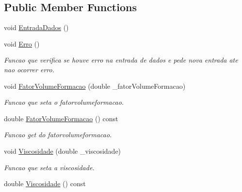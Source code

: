 \subsection*{Public Member Functions}
\begin{DoxyCompactItemize}
\item 
void \hyperlink{classCFluido_a763eff2c0992744c8482beb56171981d}{Entrada\-Dados} ()
\item 
\hypertarget{classCFluido_a6262833c7f9a37dd886a1b8c5cf798d5}{void \hyperlink{classCFluido_a6262833c7f9a37dd886a1b8c5cf798d5}{Erro} ()}\label{classCFluido_a6262833c7f9a37dd886a1b8c5cf798d5}

\begin{DoxyCompactList}\small\item\em Funcao que verifica se houve erro na entrada de dados e pede nova entrada ate nao ocorrer erro. \end{DoxyCompactList}\item 
\hypertarget{classCFluido_ad8d3ec53a4cb37b3824ec3d64a49c2bc}{void \hyperlink{classCFluido_ad8d3ec53a4cb37b3824ec3d64a49c2bc}{Fator\-Volume\-Formacao} (double \-\_\-fator\-Volume\-Formacao)}\label{classCFluido_ad8d3ec53a4cb37b3824ec3d64a49c2bc}

\begin{DoxyCompactList}\small\item\em Funcao que seta o fatorvolumeformacao. \end{DoxyCompactList}\item 
\hypertarget{classCFluido_aac30ac0af8dfa17bfdaacff472351054}{double \hyperlink{classCFluido_aac30ac0af8dfa17bfdaacff472351054}{Fator\-Volume\-Formacao} () const }\label{classCFluido_aac30ac0af8dfa17bfdaacff472351054}

\begin{DoxyCompactList}\small\item\em Funcao get do fatorvolumeformacao. \end{DoxyCompactList}\item 
\hypertarget{classCFluido_a4523b55aae9b4721de73def751cdb078}{void \hyperlink{classCFluido_a4523b55aae9b4721de73def751cdb078}{Viscosidade} (double \-\_\-viscosidade)}\label{classCFluido_a4523b55aae9b4721de73def751cdb078}

\begin{DoxyCompactList}\small\item\em Funcao que seta a viscosidade. \end{DoxyCompactList}\item 
\hypertarget{classCFluido_ac134bfe73c9e96643cc5e3a59fd658a8}{double \hyperlink{classCFluido_ac134bfe73c9e96643cc5e3a59fd658a8}{Viscosidade} () const }\label{classCFluido_ac134bfe73c9e96643cc5e3a59fd658a8}


\end{DoxyCompactItemize}
